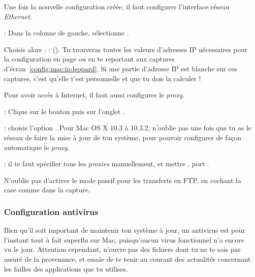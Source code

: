 Une fois la nouvelle configuration cr\'e\'ee, il faut configurer l'interface r\'eseau \emph{Ethernet}.



 : Dans la colonne de gauche, s\'electionne .

Choisis alors  :%
 :  (). Tu trouveras toutes les valeurs d'adresses IP n\'ecessaires pour la configuration en page \pageref{calcul_ip} ou en te reportant aux captures d'\'ecran~\ref{config:mac:ip:leopard}. Si une partie d'adresse IP est blanche sur ces captures, c'est qu'elle t'est personnelle et que tu dois la calculer !


  
  



Pour avoir acc\`es \`a  Internet, il faut aussi configurer le \emph{proxy}.

 : Clique sur le bouton  puis sur l'onglet .


 :  choisis l'option . Pour Mac OS X 10.3 \`a  10.3.2, n'oublie pas une fois que tu as le r\'eseau de faire la mise \`a  jour de ton syst\`eme, pour pouvoir configurer de fa\c con automatique le \emph{proxy}.

 : il te faut sp\'ecifier tous les
\emph{proxies} manuellement, et mettre , port .


N'oublie pas d'activer le mode passif pour les transferts en FTP, en cochant la case comme dans la capture.

\subsubsection{Configuration antivirus}

Bien qu'il soit important de maintenir ton syst\`eme \`a  jour, un antivirus est pour l'instant tout \`a  fait superflu sur Mac, puisqu'aucun virus fonctionnel n'a encore vu le jour. Attention cependant, n'ouvre pas des fichiers dont tu ne te sois pas assur\'e de la provenance, et essaie de te tenir au courant des actualit\'es concernant les failles des applications que tu utilises.

